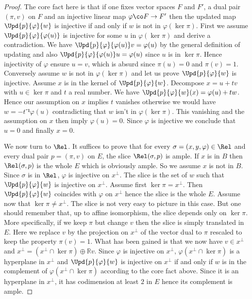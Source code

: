 \begin{proof}
  \leanok
  The core fact here is that if one fixes vector spaces $F$ and $F'$, a dual
  pair $(\pi, v)$ on $F$ and an injective linear map $\varphi \co F \to F'$
  then the updated map $\Upd{p}{\varphi}{w}$ is injective if and only if $w$
  is not in $\varphi(\ker\pi)$. First we assume $\Upd{p}{\varphi}{\varphi(u)}$
  is injective for some $u$ in $\varphi(\ker\pi)$ and derive a contradiction.
  We have $\Upd{p}{\varphi}{\varphi(u)}v = \varphi(u)$ by the general
  definition of updating and also $\Upd{p}{\varphi}{\varphi(u)}u = \varphi(u)$
  since $u$ is in $\ker \pi$. Hence injectivity of $\varphi$ ensure $u = v$,
  which is absurd since $\pi(u) = 0$ and $\pi(v) = 1$. Conversely assume $w$
  is not in $\varphi(\ker\pi)$ and let us prove $\Upd{p}{\varphi}{w}$ is
  injective. Assume $x$ is in the kernel of $\Upd{p}{\varphi}{w}$. Decompose
  $x = u + tv$ with $u \in \ker\pi$ and $t$ a real number. We have
  $\Upd{p}{\varphi}{w}(x) = \varphi(u) + tw$. Hence our assumption on $x$
  implies $t$ vanishes otherwise we would have $w = -t⁻¹\varphi(u)$
  contradicting that $w$ isn't in $\varphi(\ker\pi)$. This vanishing and the
  assumption on $x$ then imply $\varphi(u) = 0$. Since $\varphi$ is injective
  we conclude that $u = 0$ and finally $x = 0$.

  We now turn to $\Rel$. It suffices to prove that for every $\sigma = (x, y,
  \varphi) \in \Rel$ and every dual pair $p = (\pi, v)$ on $E$, the slice
  $\Rel(\sigma, p)$ is ample. If $x$ is in $B$ then $\Rel(\sigma, p)$ is the
  whole $E$ which is obviously ample. So we assume $x$ is not in $B$. Since
  $\sigma$ is in $\Rel$, $\varphi$ is injective on $x^\perp$. The slice is the
  set of $w$ such that $\Upd{p}{\varphi}{w}$ is injective on $x^\perp$. Assume
  first $\ker\pi = x^\perp$. Then $\Upd{p}{\varphi}{w}$ coincides with
  $\varphi$ on $x^\perp$ hence the slice is the whole $E$. Assume now that
  $\ker\pi \neq x^\perp$. The slice is not very easy to picture in this case.
  But one should remember that, up to affine isomorphism, the slice depends
  only on $\ker \pi$. More specifically, if we keep $\pi$ but change $v$ then
  the slice is simply translated in $E$. Here we replace $v$ by the projection
  on $x^\perp$ of the vector dual to $\pi$ rescaled to keep the property
  $\pi(v) = 1$. What has been gained is that we now have $v \in x^\perp$ and
  $x^\perp = (x^\perp \cap \ker \pi) \oplus ℝ v$. Since $\varphi$ is
  injective on $x^\perp$, $\varphi(x^\perp \cap \ker \pi)$ is a hyperplane
  in $x^\perp$ and $\Upd{p}{\varphi}{w}$ is injective on $x^\perp$ if and only
  if $w$ is in the complement of $\varphi(x^\perp \cap \ker \pi)$ according to
  the core fact above. Since it is an hyperplane in $x^\perp$, it has
  codimension at least $2$ in $E$ hence its complement is ample.
\end{proof}

